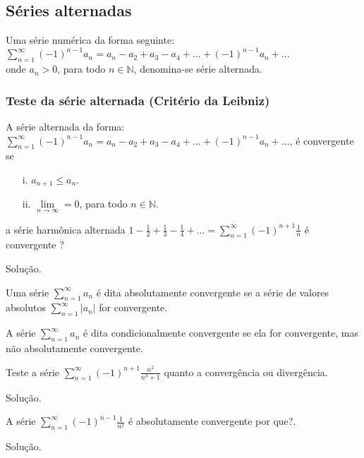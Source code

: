 \subsection{Séries alternadas}
Uma série numérica da forma seguinte:\\

$\sum_{n=1}^{\infty}(-1)^{n-1}a_{n}=a_{n}-a_{2}+a_{3}-a_{4}+...+(-1)^{n-1}a_{n}+...$\\
onde $a_{n}>0$, para todo $n\in \mathbb{N}$, denomina-se série alternada.
\subsubsection{Teste da série alternada (Critério da Leibniz)} 

A série alternada da forma: \\

$\sum_{n=1}^{\infty}(-1)^{n-1}a_{n}=a_{n}-a_{2}+a_{3}-a_{4}+...+(-1)^{n-1}a_{n}+...$, é convergente se 
\begin{itemize}
	\item[i.] $a_{n+1}\leq a_{n}$.
	\item[ii.] $\lim\limits_{n\rightarrow\infty}=0$, para todo $n\in\mathbb{N}$.
\end{itemize} 
\begin{ex}
	a série harmônica alternada $1-\frac{1}{2}+\frac{1}{3}-\frac{1}{4}+...=\sum_{n=1}^{\infty}(-1)^{n+1}\frac{1}{n}$ é convergente ?
	
	Solução.
\end{ex}
\vspace*{5cm}
\begin{df}
	Uma série $\sum_{n=1}^{\infty}a_{n}$ é dita absolutamente convergente se a série de valores absolutos $\sum_{n=1}^{\infty}|a_{n}|$ for convergente.
\end{df}
\begin{df}
	A série $\sum_{n=1}^{\infty}a_{n}$ é dita condicionalmente convergente se ela for convergente, mas não absolutamente convergente.
\end{df}
\begin{ex}
	Teste a série $\sum_{n=1}^{\infty}(-1)^{n+1}\frac{n^{2}}{n^{3}+1}$ quanto a convergência ou divergência.
	
	Solução.
\end{ex}
\vspace*{5cm}
\begin{ex}
	A série $\sum_{n=1}^{\infty}(-1)^{n-1}\frac{1}{n^{2}}$ é absolutamente convergente por que?.
	
	Solução.
\end{ex}

